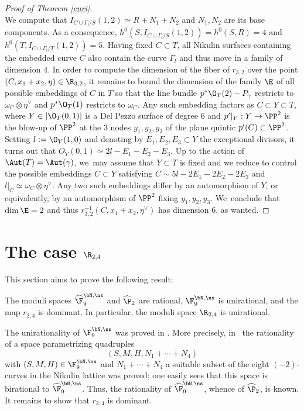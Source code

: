 \begin{proof}[Proof of Theorem \ref{enri}]
\[\]
We compute that $I_{C\cup \Gamma_l/S}(1,2)\simeq R+N_1+N_2$ and $N_1,N_2$ are its base components. As a consequence, $h^0(S, I_{C\cup \Gamma_l/S}(1,2))=h^0(S,R)=4$ and $h^0(T, I_{C\cup \Gamma_l/T}(1,2))=5$. Having fixed $C\subset T$, all Nikulin surfaces containing the embedded curve $C$ also contain the curve $\Gamma_l$ and thus move in a family of dimension $4$. In order to compute the dimension of the fiber of $r_{3,2}$ over the point $(C,x_1+x_2,\eta)\in \R_{3,2}$, it remains to bound the dimension of the family $\E$ of all possible embeddings of $C$ in $T$ so that the line bundle $p^*\O_T(2)-P_\gamma$ restricts to $\omega_C\otimes \eta^\vee$ and $p^*\O_T(1)$ restricts to $\omega_C$. Any such embedding factors as $C\subset Y\subset T$, where $Y\in |\O_T(0,1)|$ is a Del Pezzo surface of degree $6$ and $p'|_Y:Y\to \PP^2$ is the blow-up of $\PP^2$ at the $3$ nodes $y_1,y_2,y_3$ of the plane quintic $p'(C)\subset \PP^2$. Setting $l:=\O_Y(1,0)$ and denoting by $E_1,E_2,E_3\subset Y$ the exceptional divisors, it turns out that $O_Y(0,1)\simeq 2l-E_1-E_2-E_3$. Up to the action of $\Aut(T)=\Aut(\gamma)$, we~may assume that $Y\subset T$ is fixed and we reduce to control the possible embeddings $C\subset Y$ satisfying $C\sim 5l-2E_1-2E_2-2E_3$ and $l|_C\simeq \omega_C\otimes \eta^\vee$. Any two such embeddings differ by an automorphism of $Y$, or equivalently, by an automorphism of $\PP^2$ fixing $y_1,y_2,y_3$. We~conclude that $\dim \E=2$ and thus $r_{3,2}^{-1}(C,x_1+x_2,\eta^\vee) $ has dimension $6$, as wanted.\Changelback
\end{proof}

\section{The case \texorpdfstring{$\R_{2,4}$}{R}}

This section aims to prove the following result:

\begin{thm}\label{giorgio}
The moduli spaces $\widehat{\F}_{9}^{\bN,\ns}$ and $\widehat\P_{2}$ are rational,
$\F_{9}^{\bN,\ns}$ is unirational, and
the map $r_{2,4}$ is dominant. In particular, the moduli space $\R_{2,4}$ is unirational.
\end{thm}

The unirationality of $\F_{9}^{\bN,\ns}$ was proved in \cite[Th.\,1.2]{KLV2}. More precisely, in~\cite[Th.\,4.5]{KLV2} the rationality of a space parametrizing quadruples\vspace*{-3pt}\enlargethispage{.5\baselineskip}
\[
(S,M,H,N_1+\cdots +N_4)
\]
with $(S,M,H) \in \F_{9}^{\bN,\ns}$ and $N_1+\cdots+N_4$ a suitable subset of the eight $(-2)$-curves in the Nikulin lattice was proved; one easily sees that this space is birational to $\widehat{\F}_{9}^{\bN,\ns}$. Thus, the rationality of
$\widehat{\F}_{9}^{\bN,\ns}$, whence of $\widehat\P_{2}$, is known. It remains to show that $r_{2,4}$ is dominant.

